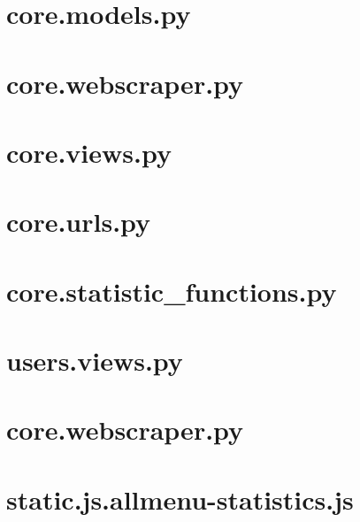 \section{core.models.py}\label{code:core.models.py}

\section{core.webscraper.py}\label{code:core.webscraper.py}

\section{core.views.py}\label{code:core.views.py}

\section{core.urls.py}\label{code:core.urls.py}

\section{core.statistic\_functions.py}\label{code:core.statistic-functions.py}

\section{users.views.py}\label{code:users.views.py}

\section{core.webscraper.py}\label{code:core.webscraper.py}

\section{static.js.allmenu-statistics.js}\label{code:static.js.allmenu-statistics.js}

